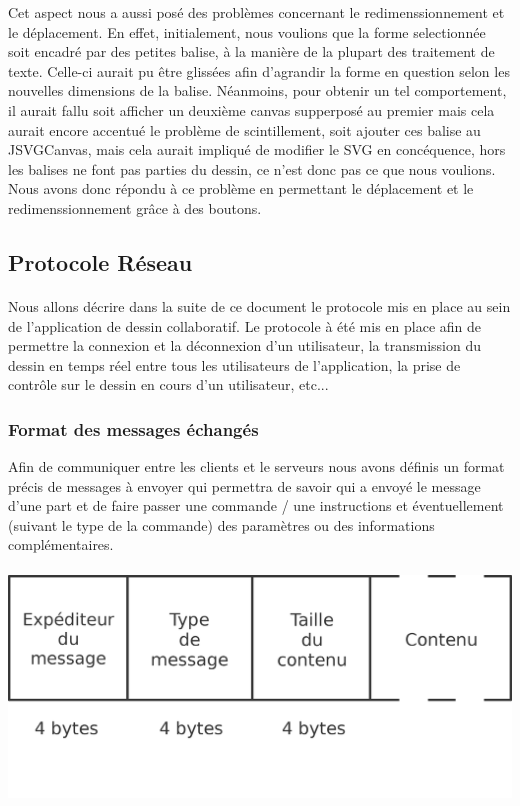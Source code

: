 \documentclass[a4paper,11pt]{article}
\begin{document}
Cet aspect nous a aussi posé des problèmes concernant le redimenssionnement et le déplacement. En effet, initialement, nous voulions que la forme selectionnée soit encadré par des petites balise, à la manière de la plupart des traitement de texte. Celle-ci aurait pu être glissées afin d'agrandir la forme en question selon les nouvelles dimensions de la balise. Néanmoins, pour obtenir un tel comportement, il aurait fallu soit afficher un deuxième canvas supperposé au premier mais cela aurait encore accentué le problème de scintillement, soit ajouter ces balise au JSVGCanvas, mais cela aurait impliqué de modifier le SVG en concéquence, hors les balises ne font pas parties du dessin, ce n'est donc pas ce que nous voulions. Nous avons donc répondu à ce problème en permettant le déplacement et le redimenssionnement grâce à des boutons.

\subsection{Protocole Réseau}

\paragraph{} Nous allons décrire dans la suite de ce document le protocole mis en place au sein de l'application de dessin collaboratif. Le protocole à été mis en place afin de permettre la connexion et la déconnexion d'un utilisateur, la transmission du dessin en temps réel entre tous les utilisateurs de l'application, la prise de contrôle sur le dessin en cours d'un utilisateur, etc... 

\subsubsection{Format des messages échangés}
Afin de communiquer entre les clients et le serveurs nous avons définis un format précis de messages à envoyer qui permettra de savoir qui a envoyé le message d'une part et de faire passer une commande / une instructions et éventuellement (suivant le type de la commande) des paramètres ou des informations complémentaires.

\paragraph{}
\includegraphics[scale=0.5]{image/message.png}
\end{document}
